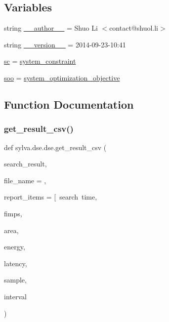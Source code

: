 \subsection*{Variables}
\begin{DoxyCompactItemize}
\item 
string \hyperlink{namespacesylva_1_1dse_1_1dse_ae75d8649b8c58b165513c61e2c9e62c7}{\+\_\+\+\_\+author\+\_\+\+\_\+} = \textquotesingle{}Shuo Li $<$contact@shuol.\+li$>$\textquotesingle{}
\item 
string \hyperlink{namespacesylva_1_1dse_1_1dse_a9c1f8ee252b6dc4cc07384ac848d62cf}{\+\_\+\+\_\+version\+\_\+\+\_\+} = \textquotesingle{}2014-\/09-\/23-\/10\+:41\textquotesingle{}
\item 
\hyperlink{namespacesylva_1_1dse_1_1dse_ac2d9fdcc3f7fd0bad1900fa0a813dff4}{sc} = \hyperlink{classsylva_1_1dse_1_1dse_1_1system__constraint}{system\+\_\+constraint}
\item 
\hyperlink{namespacesylva_1_1dse_1_1dse_ab54fbae03bc2c432fecd4486e623af71}{soo} = \hyperlink{classsylva_1_1dse_1_1dse_1_1system__optimization__objective}{system\+\_\+optimization\+\_\+objective}
\end{DoxyCompactItemize}


\subsection{Function Documentation}
\mbox{\label{namespacesylva_1_1dse_1_1dse_afcf62d3580889d2c99cb16694f738e02}} 
\subsubsection{\texorpdfstring{get\+\_\+result\+\_\+csv()}{get\_result\_csv()}}
{\footnotesize\ttfamily def sylva.\+dse.\+dse.\+get\+\_\+result\+\_\+csv (\begin{DoxyParamCaption}\item[{}]{search\+\_\+result,  }\item[{}]{file\+\_\+name = {\ttfamily \textquotesingle{}\textquotesingle{}},  }\item[{}]{report\+\_\+items = {\ttfamily \mbox{[}~\textquotesingle{}search~time\textquotesingle{}},  }\item[{}]{fimps,  }\item[{}]{area,  }\item[{}]{energy,  }\item[{}]{latency,  }\item[{}]{sample,  }\item[{}]{interval }\end{DoxyParamCaption})}



